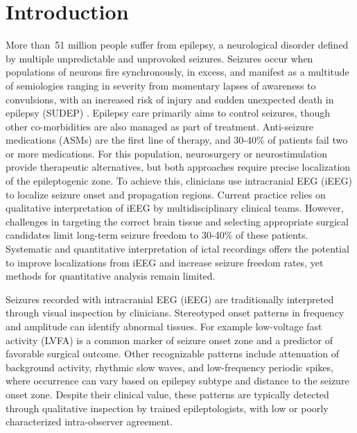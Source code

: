 \documentclass[11pt]{article}
\begin{document}
\newpage

\section*{Introduction}
More than 51 million people suffer from epilepsy, a neurological disorder defined by multiple unpredictable and unprovoked seizures\cite{Fiest2017Prevalence}. Seizures occur when populations of neurons fire synchronously, in excess, and manifest as a multitude of semiologies ranging in severity from momentary lapses of awareness to convulsions, with an increased risk of injury and sudden unexpected death in epilepsy (SUDEP) \cite{Fisher2005Epileptic}. Epilepsy care primarily aims to control seizures, though other co-morbidities are also managed as part of treatment\cite{Avalos2020Quality,Elliott2009Comorbidity}. Anti-seizure medications (ASMs) are the first line of therapy, and 30-40\% of patients fail two or more medications. For this population, neurosurgery or neurostimulation provide therapeutic alternatives, but both approaches require precise localization of the epileptogenic zone. To achieve this, clinicians use intracranial EEG (iEEG) to localize seizure onset and propagation regions. Current practice relies on qualitative interpretation of iEEG by multidisciplinary clinical teams. However, challenges in targeting the correct brain tissue and selecting appropriate surgical candidates limit long-term seizure freedom to 30-40\% of these patients\cite{englot_rates_2014}. Systematic and quantitative interpretation of ictal recordings offers the potential to improve localizations from iEEG and increase seizure freedom rates, yet methods for quantitative analysis remain limited.

Seizures recorded with intracranial EEG (iEEG) are traditionally interpreted through visual inspection by clinicians. Stereotyped onset patterns in frequency and amplitude can identify abnormal tissues. For example low-voltage fast activity (LVFA) is a common marker of seizure onset zone and a predictor of favorable surgical outcome\cite{Shokooh2021Intracranial, Lee2000Intracranial, Hu2022Ictal, Alter2019Ictal}. Other recognizable patterns include attenuation of background activity, rhythmic slow waves, and low-frequency periodic spikes, where occurrence can vary based on epilepsy subtype and distance to the seizure onset zone\cite{Dolezalova2013Intracranial,Ferrari2016Intracranial}. Despite their clinical value, these patterns are typically detected through qualitative inspection by trained epileptologists, with low or poorly characterized intra-observer agreement\cite{Park1996significance,Perucca2014Intracranial,Singh2015Ictal}.
\end{document}
